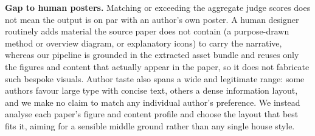\documentclass{article}
\begin{document}
\textbf{Gap to human posters.} Matching or exceeding the aggregate judge scores does not mean the output is on par with an author's own poster. A human designer routinely adds material the source paper does not contain (a purpose-drawn method or overview diagram, or explanatory icons) to carry the narrative, whereas our pipeline is grounded in the extracted asset bundle and reuses only the figures and content that actually appear in the paper, so it does not fabricate such bespoke visuals. Author taste also spans a wide and legitimate range: some authors favour large type with concise text, others a dense information layout, and we make no claim to match any individual author's preference. We instead analyse each paper's figure and content profile and choose the layout that best fits it, aiming for a sensible middle ground rather than any single house style.
\end{document}

